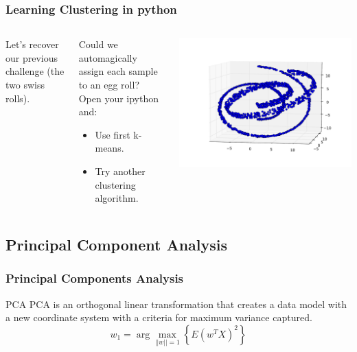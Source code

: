 \documentclass[10pt, colorlinks]{beamer}
\begin{document}
\begin{frame}[fragile]\frametitle{{Learning Clustering in python}}
\begin{columns}[c]
Let's recover our previous challenge (the two swiss rolls). 

\begin{block}{}
Could we automagically assign each sample to an egg roll?  Open your ipython and:
\begin{itemize}
    \item Use first k-means.
    \item Try another clustering algorithm.
\end{itemize}
\end{block}

\includegraphics[width=\textwidth]{plwfigis/CursP_4_figure5}

\end{columns}
\end{frame}

\subsection{Principal Component Analysis} %
\label{sec:}
\begin{frame}[fragile]\frametitle{Principal Components Analysis}
\begin{block}{PCA}
PCA is an orthogonal linear transformation that creates a data model with a new coordinate system with a criteria for maximum variance captured.
 \begin{equation}
     w_1 = \arg\max_{||w||=1} \left\{ E(w^T X)^2\right\}
 \end{equation}
\end{block}
\end{frame}
\end{document}
